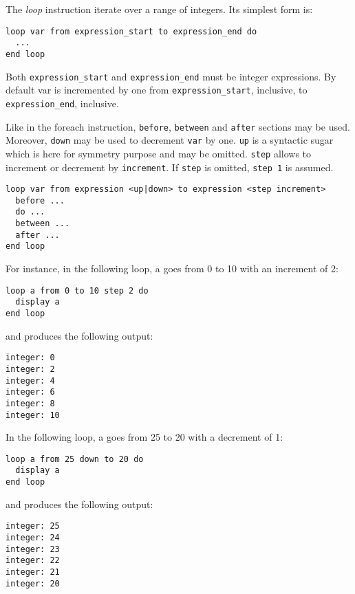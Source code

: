 \documentclass[11pt]{article}
\newcommand{\var}[1]{{\small\ttfamily #1}}
\begin{document}
{The {\em loop} instruction iterate over a range of integers. Its simplest form is:

\begin{lstlisting}
loop var from expression_start to expression_end do
  ...
end loop
\end{lstlisting}

Both \lstinline{expression_start} and \lstinline{expression_end} must be integer expressions. By default \var{var} is incremented by one from \lstinline{expression_start}, inclusive, to \lstinline{expression_end}, inclusive. 

Like in the foreach instruction, \lstinline{before},  \lstinline{between} and \lstinline{after} sections may be used. Moreover, \lstinline{down} may be used to decrement \lstinline{var} by one. \lstinline{up} is a syntactic sugar which is here for symmetry purpose and may be omitted. \lstinline{step} allows to increment or decrement by \lstinline{increment}. If \lstinline{step} is omitted, \lstinline{step 1} is assumed.

\begin{lstlisting}
loop var from expression <up|down> to expression <step increment>
  before ...
  do ...
  between ...
  after ...
end loop
\end{lstlisting}

For instance, in the following loop, \var{a} goes from 0 to 10 with an increment of 2:

\begin{lstlisting}
loop a from 0 to 10 step 2 do
  display a
end loop
\end{lstlisting}

and produces the following output:

{\small
\begin{verbatim}
integer: 0
integer: 2
integer: 4
integer: 6
integer: 8
integer: 10
\end{verbatim}
}

In the following loop, \var{a} goes from 25 to 20 with a decrement of 1:

\begin{lstlisting}
loop a from 25 down to 20 do
  display a
end loop
\end{lstlisting}

and produces the following output:

{\small
\begin{verbatim}
integer: 25
integer: 24
integer: 23
integer: 22
integer: 21
integer: 20
\end{verbatim}
}

}
\end{document}
